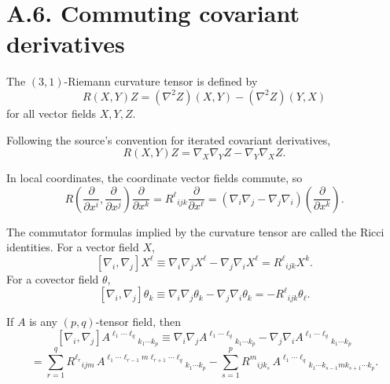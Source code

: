 \section*{A.6. Commuting covariant derivatives}

\begin{definition}
\label{appa-def-riemann-curvature-via-covariant-derivatives}
The \((3,1)\)-Riemann curvature tensor is defined by
\[
R(X,Y)Z=(\nabla^2 Z)(X,Y)-(\nabla^2 Z)(Y,X)
\]
for all vector fields \(X,Y,Z\).
\end{definition}

\begin{remark}
\label{appa-rem-curvature-commutator}
Following the source's convention for iterated covariant derivatives,
\[
R(X,Y)Z=\nabla_X\nabla_YZ-\nabla_Y\nabla_XZ.
\]
\end{remark}

\begin{remark}
\label{appa-rem-curvature-coordinate-form}
In local coordinates, the coordinate vector fields commute, so
\[
R\!\left(\frac{\partial}{\partial x^i},\frac{\partial}{\partial x^j}\right)\frac{\partial}{\partial x^k}
=R^\ell{}_{ijk}\frac{\partial}{\partial x^\ell}
=\left(\nabla_i\nabla_j-\nabla_j\nabla_i\right)\!\left(\frac{\partial}{\partial x^k}\right).
\]
\end{remark}

\begin{remark}
\label{appa-rem-ricci-identities}
The commutator formulas implied by the curvature tensor are called the Ricci identities. For a vector field \(X\),
\[
[\nabla_i,\nabla_j]X^\ell \equiv \nabla_i\nabla_jX^\ell-\nabla_j\nabla_iX^\ell = R^\ell{}_{ijk}X^k.
\]
For a covector field \(\theta\),
\[
[\nabla_i,\nabla_j]\theta_k \equiv \nabla_i\nabla_j\theta_k-\nabla_j\nabla_i\theta_k = -R^\ell{}_{ijk}\theta_\ell.
\]
\end{remark}

\begin{remark}
\label{appa-rem-commutator-general-tensors}
If \(A\) is any \((p,q)\)-tensor field, then
\[
[\nabla_i,\nabla_j]A^{\ell_1\cdots \ell_q}{}_{k_1\cdots k_p}
\equiv \nabla_i\nabla_j A^{\ell_1\cdots \ell_q}{}_{k_1\cdots k_p}
-\nabla_j\nabla_i A^{\ell_1\cdots \ell_q}{}_{k_1\cdots k_p}
\]
\[
= \sum_{r=1}^q R^{\ell_r}{}_{ijm}\,A^{\ell_1\cdots \ell_{r-1}m\ell_{r+1}\cdots \ell_q}{}_{k_1\cdots k_p}
- \sum_{s=1}^p R^{m}{}_{ijk_s}\,A^{\ell_1\cdots \ell_q}{}_{k_1\cdots k_{s-1}mk_{s+1}\cdots k_p}.
\]
\end{remark}
